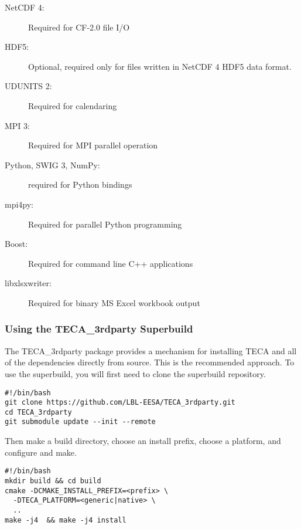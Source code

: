 \documentclass[a4paper,10pt,DIV=12]{scrreprt}
\begin{document}
\vspace{2mm}\hspace{0.2in}\begin{minipage}{0.8\textwidth}
\begin{description}
 \item[NetCDF 4:] Required for CF-2.0 file I/O
 \item[HDF5:] Optional, required only for files written in NetCDF 4 HDF5 data format.
 \item[UDUNITS 2:] Required for calendaring
 \item[MPI 3:] Required for MPI parallel operation
 \item[Python, SWIG 3, NumPy:] required for Python bindings
 \item[mpi4py:] Required for parallel Python programming
 \item[Boost:] Required for command line C++ applications
 \item[libxlsxwriter:] Required for binary MS Excel workbook output
\end{description}
\end{minipage}\vspace{2mm}

\subsubsection{Using the TECA\_3rdparty Superbuild} The TECA\_3rdparty package provides
a mechanism for installing TECA and all of the dependencies directly from source. 
This is the recommended approach. To use the superbuild, you will first need to clone
the superbuild repository.

\vspace{2mm}\hspace{0.2in}\begin{minipage}{0.8\textwidth}
\begin{verbatim}
#!/bin/bash
git clone https://github.com/LBL-EESA/TECA_3rdparty.git
cd TECA_3rdparty
git submodule update --init --remote
\end{verbatim}
\end{minipage}\vspace{2mm}

\noindent Then make a build directory, choose an install prefix, choose a platform,
and configure and make.

\vspace{2mm}\hspace{0.2in}\begin{minipage}{0.8\textwidth}
\begin{verbatim}
#!/bin/bash
mkdir build && cd build
cmake -DCMAKE_INSTALL_PREFIX=<prefix> \
  -DTECA_PLATFORM=<generic|native> \
  ..
make -j4  && make -j4 install
\end{verbatim}
\end{minipage}\vspace{2mm}
\end{document}
